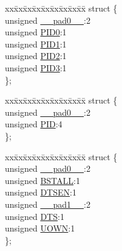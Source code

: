 \begin{DoxyCompactItemize}
\begin{tabbing}
\end{tabbing}\item 
\begin{tabbing}
xx\=xx\=xx\=xx\=xx\=xx\=xx\=xx\=xx\=\kill
struct \{\\
\>unsigned \hyperlink{union___b_d___s_t_a_t_adf71f3d8410c1f1dbbc96680a92c49af}{\_\_pad0\_\_}:2\\
\>unsigned \hyperlink{union___b_d___s_t_a_t_a810a2f6d15fc42c5d1e610b6e927d2eb}{PID0}:1\\
\>unsigned \hyperlink{union___b_d___s_t_a_t_acefd8c6eba334031c18cd877dfe08bfb}{PID1}:1\\
\>unsigned \hyperlink{union___b_d___s_t_a_t_aef3d6a9445a3c61d870212360c0a6110}{PID2}:1\\
\>unsigned \hyperlink{union___b_d___s_t_a_t_a771971768126aebea428ac7194b17fc0}{PID3}:1\\
\}; \\

\end{tabbing}\item 
\begin{tabbing}
xx\=xx\=xx\=xx\=xx\=xx\=xx\=xx\=xx\=\kill
struct \{\\
\>unsigned \hyperlink{union___b_d___s_t_a_t_adf71f3d8410c1f1dbbc96680a92c49af}{\_\_pad0\_\_}:2\\
\>unsigned \hyperlink{union___b_d___s_t_a_t_a97b41b25e06fd7857dcc6217c160a8ad}{PID}:4\\
\}; \\

\end{tabbing}\item 
\begin{tabbing}
xx\=xx\=xx\=xx\=xx\=xx\=xx\=xx\=xx\=\kill
struct \{\\
\>unsigned \hyperlink{union___b_d___s_t_a_t_adf71f3d8410c1f1dbbc96680a92c49af}{\_\_pad0\_\_}:2\\
\>unsigned \hyperlink{union___b_d___s_t_a_t_a145ee75f12c62d2a89097d18477019f2}{BSTALL}:1\\
\>unsigned \hyperlink{union___b_d___s_t_a_t_adeff6f5de2d8ca0cfa956560288c3541}{DTSEN}:1\\
\>unsigned \hyperlink{union___b_d___s_t_a_t_acaf2d0924a107ec6e8d2e31febaf66f9}{\_\_pad1\_\_}:2\\
\>unsigned \hyperlink{union___b_d___s_t_a_t_a74db087bfe32cd33c459191f7a4aeb13}{DTS}:1\\
\>unsigned \hyperlink{union___b_d___s_t_a_t_abc982c28d59f8e36dbcb06639010169d}{UOWN}:1\\
\}; \\


\end{tabbing}
\end{DoxyCompactItemize}
